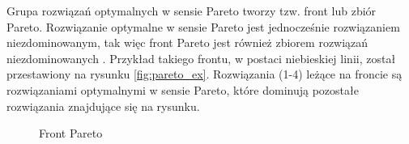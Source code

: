 \documentclass[twoside]{iisthesis}
\begin{document}
Grupa rozwiązań optymalnych w sensie Pareto tworzy tzw. front lub zbiór Pareto. Rozwiązanie optymalne w sensie Pareto jest jednocześnie rozwiązaniem niezdominowanym, tak więc front Pareto jest również zbiorem rozwiązań niezdominowanych \cite{book}. Przykład takiego frontu, w postaci niebieskiej linii, został przestawiony na rysunku \eqref{fig:pareto_ex}. Rozwiązania (1-4) leżące na froncie są rozwiązaniami optymalnymi w sensie Pareto, które dominują pozostałe rozwiązania znajdujące się na rysunku.
\begin{figure}[!htb]
	\centering
	\caption{Front Pareto}
	\label{fig:pareto_ex}
\end{figure}
\end{document}
